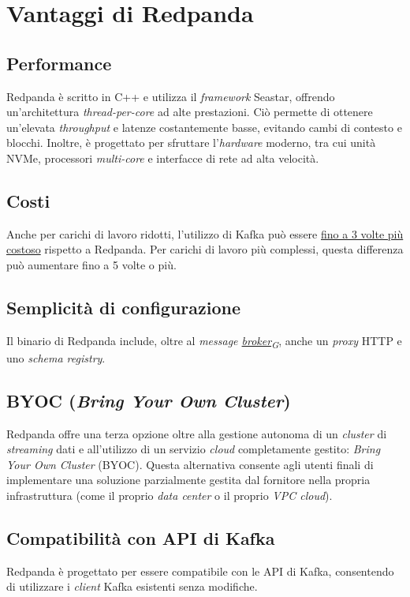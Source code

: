 \section{Vantaggi di Redpanda}
\subsection{Performance}
Redpanda è scritto in C++ e utilizza il \textit{framework} Seastar, offrendo un'architettura \textit{thread-per-core} ad alte prestazioni.
Ciò permette di ottenere un'elevata \textit{throughput} e latenze costantemente basse, evitando cambi di contesto e blocchi.
Inoltre, è progettato per sfruttare l'\textit{hardware} moderno, tra cui unità NVMe, processori \textit{multi-core} e interfacce di rete ad alta velocità.

\subsection{Costi}
Anche per carichi di lavoro ridotti, l'utilizzo di Kafka può essere \href{https://redpanda.com/blog/is-redpanda-better-than-kafka-tco-comparison}{fino a 3 volte più costoso} rispetto a Redpanda. Per carichi di lavoro più complessi, questa differenza può aumentare fino a 5 volte o più.

\subsection{Semplicità di configurazione}
Il binario di Redpanda include, oltre al \textit{message \href{https://7last.github.io/docs/rtb/documentazione-interna/glossario\#broker}{broker\textsubscript{G}}}, anche
un \textit{proxy} HTTP e uno \textit{schema registry}.

\subsection{BYOC (\textit{Bring Your Own Cluster})}
Redpanda offre una terza opzione oltre alla gestione autonoma di un \textit{cluster} di \textit{streaming}
dati e all'utilizzo di un servizio \textit{cloud} completamente gestito: \textit{Bring Your Own Cluster} (BYOC).
Questa alternativa consente agli utenti finali di implementare una soluzione parzialmente gestita dal fornitore nella propria infrastruttura (come il proprio \textit{data center}
o il proprio \textit{VPC cloud}).

\subsection{Compatibilità con API di Kafka}
Redpanda è progettato per essere compatibile con le API di Kafka, consentendo di utilizzare i \textit{client} Kafka esistenti senza modifiche.

